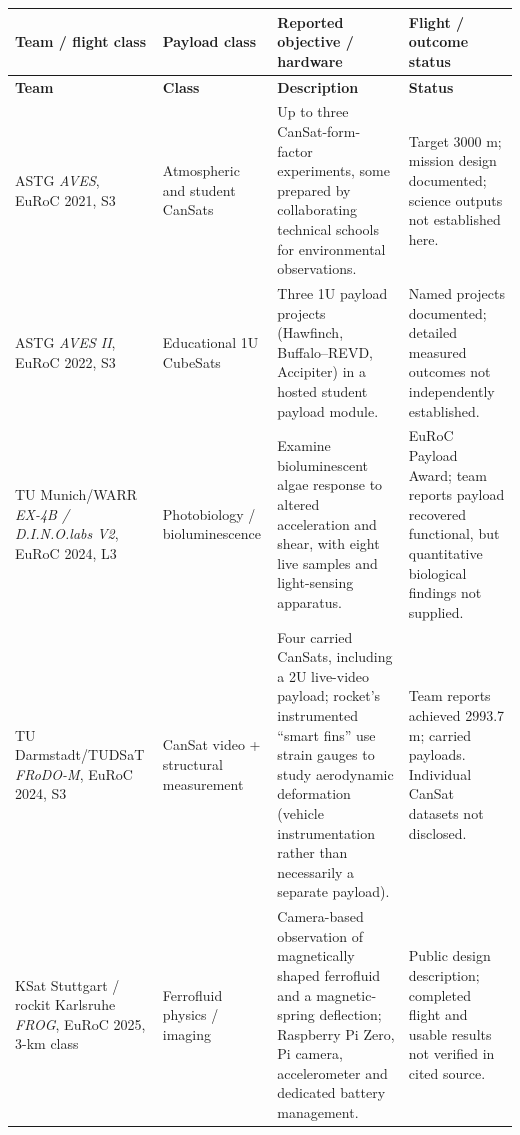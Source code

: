 \documentclass[10pt,a4paper]{article}
\begin{document}
\begin{longtable}{@{}L{36mm}L{36mm}L{48mm}L{28mm}@{}}
\toprule{}\textbf{Team / flight class} & \textbf{Payload class} & \textbf{Reported objective / hardware} & \textbf{Flight / outcome status}\\\midrule\endfirsthead
\toprule{}\textbf{Team} & \textbf{Class} & \textbf{Description} & \textbf{Status}\\\midrule\endhead
\bottomrule\endlastfoot
ASTG \emph{AVES}, EuRoC 2021, S3 \cite{astg2021aves} & Atmospheric and student CanSats & Up to three CanSat-form-factor experiments, some prepared by collaborating technical schools for environmental observations. & Target 3000 m; mission design documented; science outputs not established here.\\
ASTG \emph{AVES II}, EuRoC 2022, S3 \cite{astg2022aves2} & Educational 1U CubeSats & Three 1U payload projects (Hawfinch, Buffalo--REVD, Accipiter) in a hosted student payload module. & Named projects documented; detailed measured outcomes not independently established.\\
TU Munich/WARR \emph{EX-4B / D.I.N.O.labs V2}, EuRoC 2024, L3 \cite{warr2024spacelabs} & Photobiology / bioluminescence & Examine bioluminescent algae response to altered acceleration and shear, with eight live samples and light-sensing apparatus. & EuRoC Payload Award; team reports payload recovered functional, but quantitative biological findings not supplied.\\
TU Darmstadt/TUDSaT \emph{FRoDO-M}, EuRoC 2024, S3 \cite{tudsat2024frodo} & CanSat video + structural measurement & Four carried CanSats, including a 2U live-video payload; rocket's instrumented ``smart fins'' use strain gauges to study aerodynamic deformation (vehicle instrumentation rather than necessarily a separate payload). & Team reports achieved 2993.7 m; carried payloads. Individual CanSat datasets not disclosed.\\
KSat Stuttgart / rockit Karlsruhe \emph{FROG}, EuRoC 2025, 3-km class \cite{ksat2025frog} & Ferrofluid physics / imaging & Camera-based observation of magnetically shaped ferrofluid and a magnetic-spring deflection; Raspberry Pi Zero, Pi camera, accelerometer and dedicated battery management. & Public design description; completed flight and usable results not verified in cited source.\\
\end{longtable}
\normalsize
\end{document}
